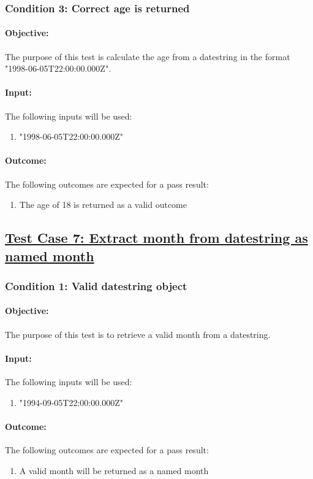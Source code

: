 \documentclass{article}
\begin{document}
\subsubsection{Condition 3: Correct age is returned  }
\paragraph{Objective:}  The purpose of this test is calculate the age from a datestring in the format "1998-06-05T22:00:00.000Z".
\paragraph{Input:} The following inputs will be used:
\begin{enumerate}
	\item "1998-06-05T22:00:00.000Z"
\end{enumerate}
\paragraph{Outcome:} The following outcomes are expected for a pass result:
\begin{enumerate}
	\item The age of 18 is returned as a valid outcome
\end{enumerate}

\pagebreak

\subsection{\underline{Test Case 7: Extract month from datestring as named month}}\label{test7}
\subsubsection{Condition 1: Valid datestring object }
\paragraph{Objective:} The purpose of this test is to retrieve a valid month from a datestring.
\paragraph{Input:} The following inputs will be used:
\begin{enumerate}
	\item "1994-09-05T22:00:00.000Z"
\end{enumerate}
\paragraph{Outcome:} The following outcomes are expected for a pass result:
\begin{enumerate}
	\item A valid month will be returned as a named month
\end{enumerate}
\end{document}
